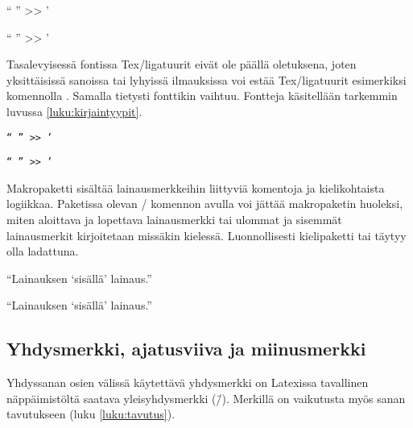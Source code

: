 \begin{koodilohkosis}
{ `` '' >> '}
\end{koodilohkosis}

\begin{tulossis}
  { `` '' >> '}
\end{tulossis}

Tasalevyisessä fontissa Tex\-/ligatuurit eivät ole päällä oletuksena,
joten yksittäisissä sanoissa tai lyhyissä ilmauksissa voi estää
Tex\-/ligatuurit esimerkiksi komennolla . Samalla
tietysti fonttikin vaihtuu. Fontteja käsitellään tarkemmin luvussa
\ref{luku:kirjaintyypit}.

\begin{koodilohkosis}
\texttt{`` '' >> '}
\end{koodilohkosis}

\begin{tulossis}
  \texttt{`` '' >> '}
\end{tulossis}

Makropaketti  sisältää
lainausmerkkeihin liittyviä komentoja ja kielikohtaista logiikkaa.
Paketissa olevan \-/ komennon avulla voi jättää
makropaketin huoleksi, miten aloittava ja lopettava lainausmerkki tai
ulommat ja sisemmät lainausmerkit kirjoitetaan missäkin kielessä.
Luonnollisesti kielipaketti  tai 
täytyy olla ladattuna.

\begin{koodilohkosis}
\usepackage{polyglossia} \setdefaultlanguage{finnish}
\usepackage[autostyle=true]{csquotes}
\enquote{Lainauksen \enquote{sisällä} lainaus.}
\end{koodilohkosis}

\begin{tulossis}
  \enquote{Lainauksen \enquote{sisällä} lainaus.}
\end{tulossis}

\subsection{Yhdysmerkki, ajatusviiva ja miinusmerkki}
\label{luku:yhdys_ajatus_miinus}

Yhdyssanan osien välissä käytettävä yhdysmerkki on Latexissa tavallinen
näppäimistöltä saatava yleisyhdysmerkki (\=/). Merkillä on vaikutusta
myös sanan tavutukseen (luku \ref{luku:tavutus}).

